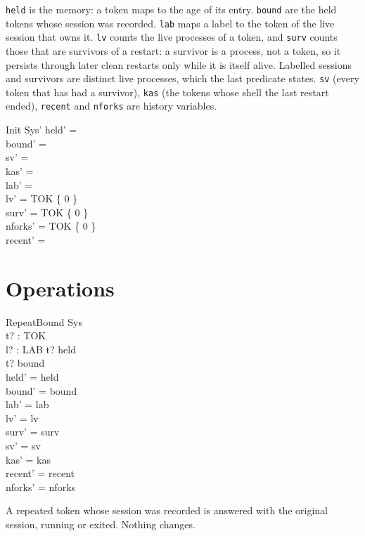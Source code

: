 \documentclass[a4paper,10pt,fleqn]{article}
\begin{document}
\texttt{held} is the memory: a token maps to the age of its entry.
\texttt{bound} are the held tokens whose session was recorded.  \texttt{lab}
maps a label to the token of the live session that owns it.  \texttt{lv} counts
the live processes of a token, and \texttt{surv} counts those that are
survivors of a restart: a survivor is a process, not a token, so it persists
through later clean restarts only while it is itself alive.  Labelled sessions
and survivors are distinct live processes, which the last predicate states.
\texttt{sv} (every token that has had a survivor), \texttt{kas} (the tokens whose shell the last restart ended), \texttt{recent} and
\texttt{nforks} are history variables.

\begin{schema}{Init}
  Sys'
\where
  held' = \emptyset \\
  bound' = \emptyset \\
  sv' = \emptyset \\
  kas' = \emptyset \\
  lab' = \emptyset \\
  lv' = TOK \cross \{ 0 \} \\
  surv' = TOK \cross \{ 0 \} \\
  nforks' = TOK \cross \{ 0 \} \\
  recent' = \langle \rangle
\end{schema}

\section{Operations}

\begin{schema}{RepeatBound}
  \Delta Sys \\
  t? : TOK \\ l? : LAB
\where
  t? \in \dom held \\
  t? \in bound \\
  held' = held \\
  bound' = bound \\
  lab' = lab \\
  lv' = lv \\
  surv' = surv \\
  sv' = sv \\
  kas' = kas \\
  recent' = recent \\
  nforks' = nforks
\end{schema}

A repeated token whose session was recorded is answered with the original session, running or exited. Nothing changes.
\end{document}
